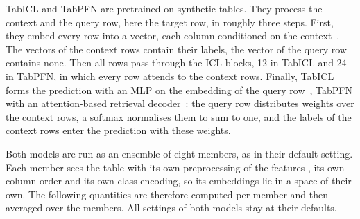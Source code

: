 \documentclass[pdflatex,sn-mathphys-num]{sn-jnl}
\begin{document}
TabICL \citep{qu2026} and TabPFN \citep{jaeger2026} are pretrained on
synthetic tables. They process the context and the query row, here the
target row, in roughly three steps.
First, they embed every row into a vector, each column conditioned on the
context~\citep{qu2026, grinsztajn2026}. The vectors of the context rows
contain their labels, the vector of the query row contains none. Then all
rows pass through the ICL blocks, 12 in TabICL and 24 in TabPFN, in which
every row attends to the context rows. Finally, TabICL forms the
prediction with an MLP on the embedding of the query
row~\citep{qu2026}, TabPFN with an attention-based retrieval decoder~\citep{grinsztajn2026}: the query row distributes weights over
the context rows, a softmax normalises them to sum to one, and the labels
of the context rows enter the prediction with these weights.

Both models are run as an ensemble of eight members, as in their default
setting. Each member sees the table with its own preprocessing of the
features \citep{qu2025, grinsztajn2026}, its own column order and its own
class encoding, so its embeddings lie in a space of their own. The
following quantities are therefore computed per member and then averaged
over the members. All settings of both models stay at their defaults.
\end{document}
